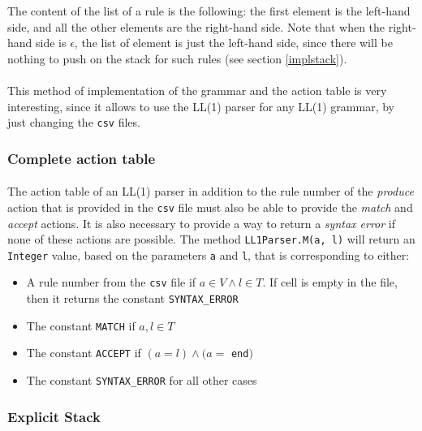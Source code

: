 \documentclass[letterpaper]{article}
\begin{document}
The content of the list
of a rule is the following: the first element is the left-hand side, and
all the other elements are the right-hand side.
Note that when the right-hand side is $\epsilon$, the list of element
is just the left-hand side,
since there will be nothing to push on the stack for such
rules (see section \ref{implstack}).

\paragraph{}

This method of implementation of the grammar and the action table is very
interesting, since it allows to use the LL(1) parser for any LL(1) grammar,
by just changing the \texttt{csv} files.

\subsubsection{Complete action table}

\paragraph{}

The action table of an LL(1) parser in addition to the rule number of the
\textit{produce} action that is provided in the \texttt{csv} file must
also be able to provide the \textit{match} and \textit{accept} actions. It
is also necessary to provide a way to return a \textit{syntax error}
if none of these actions are possible. The method \texttt{LL1Parser.M(a, l)}
will return an \texttt{Integer} value, based on the parameters \texttt{a} and
\texttt{l},
 that is corresponding to either:
\begin{itemize}
    \item A rule number from the \texttt{csv} file if $a \in V \wedge l \in T$.
    If cell is empty in the file, then it returns the constant
    \texttt{SYNTAX\_ERROR}
    \item The constant \texttt{MATCH} if $a, l \in T$
    \item The constant \texttt{ACCEPT} if $(a = l) \wedge (a =$ \texttt{end}$)$
    \item The constant \texttt{SYNTAX\_ERROR} for all other cases
\end{itemize}

\label{implactiontable}

\subsubsection{Explicit Stack}
\end{document}
